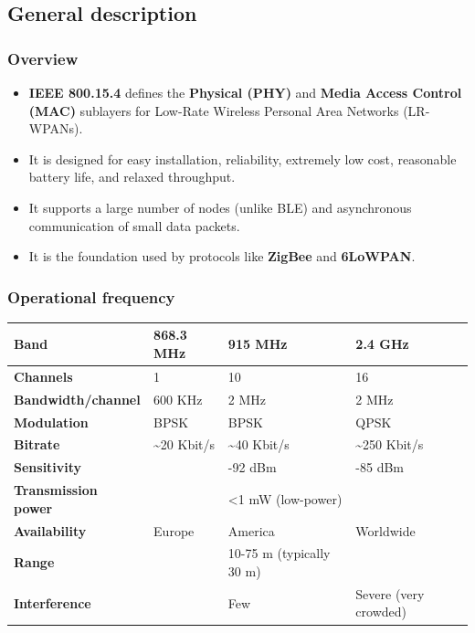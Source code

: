 \documentclass[a4paper, 12pt]{book} %
\begin{document}
\subsection{General description}\label{general-description}

\subsubsection{Overview}\label{overview}

\begin{itemize}
\tightlist
\item
  \textbf{IEEE 800.15.4} defines the \textbf{Physical (PHY)} and
  \textbf{Media Access Control (MAC)} sublayers for Low-Rate Wireless
  Personal Area Networks (LR-WPANs).
\item
  It is designed for easy installation, reliability, extremely low cost,
  reasonable battery life, and relaxed throughput.
\item
  It supports a large number of nodes (unlike BLE) and asynchronous
  communication of small data packets.
\item
  It is the foundation used by protocols like \textbf{ZigBee} and
  \textbf{6LoWPAN}.
\end{itemize}

\subsubsection{Operational frequency}\label{operational-frequency}

\begin{longtable}[]{@{}llll@{}}
\toprule\noalign{}
Band & 868.3 MHz & 915 MHz & 2.4 GHz \\
\midrule\noalign{}
\endhead
\bottomrule\noalign{}
\endlastfoot
\textbf{Channels} & 1 & 10 & 16 \\
\textbf{Bandwidth/channel} & 600 KHz & 2 MHz & 2 MHz \\
\textbf{Modulation} & BPSK & BPSK & QPSK \\
\textbf{Bitrate} & \textasciitilde20 Kbit/s & \textasciitilde40 Kbit/s &
\textasciitilde250 Kbit/s \\
\textbf{Sensitivity} & & -92 dBm & -85 dBm \\
\textbf{Transmission power} & & \textless1 mW (low-power) & \\
\textbf{Availability} & Europe & America & Worldwide \\
\textbf{Range} & & 10-75 m (typically 30 m) & \\
\textbf{Interference} & & Few & Severe (very crowded) \\
\end{longtable}
\end{document}
